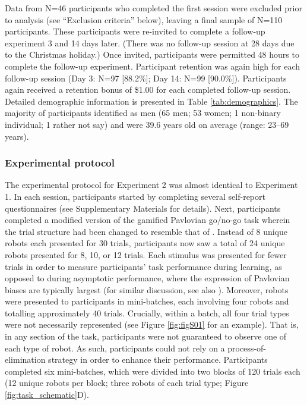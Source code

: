 \documentclass[a4paper,12pt]{article}
\begin{document}
\begin{refsection}[main]
Data from N=46 participants who completed the first session were excluded prior to analysis (see ``Exclusion criteria'' below), leaving a final sample of N=110 participants. These participants were re-invited to complete a follow-up experiment 3 and 14 days later. (There was no follow-up session at 28 days due to the Christmas holiday.) Once invited, participants were permitted 48 hours to complete the follow-up experiment. Participant retention was again high for each follow-up session (Day 3: N=97 [88.2\%]; Day 14: N=99 [90.0\%]). Participants again received a retention bonus of \$1.00 for each completed follow-up session. Detailed demographic information is presented in Table \ref{tab:demographics}. The majority of participants identified as men (65 men; 53 women; 1 non-binary individual; 1 rather not say) and were 39.6 years old on average (range: 23--69 years).

\subsubsection*{Experimental protocol}

The experimental protocol for Experiment 2 was almost identical to Experiment 1. In each session, participants started by completing several self-report questionnaires (see Supplementary Materials for details). Next, participants completed a modified version of the gamified Pavlovian go/no-go task wherein the trial structure had been changed to resemble that of \cite{wittmann2008striatal}. Instead of 8 unique robots each presented for 30 trials, participants now saw a total of 24 unique robots presented for 8, 10, or 12 trials. Each stimulus was presented for fewer trials in order to measure participants' task performance during learning, as opposed to during asymptotic performance, where the expression of Pavlovian biases are typically largest (for similar discussion, see also \cite{zorowitzPLACEHOLDER}). Moreover, robots were presented to participants in mini-batches, each involving four robots and totalling approximately 40 trials. Crucially, within a batch, all four trial types were not necessarily represented (see Figure \ref{fig:figS01} for an example). That is, in any section of the task, participants were not guaranteed to observe one of each type of robot. As such, participants could not rely on a process-of-elimination strategy in order to enhance their performance. Participants completed six mini-batches, which were divided into two blocks of 120 trials each (12 unique robots per block; three robots of each trial type; Figure \ref{fig:task_schematic}D).


\end{refsection}
\end{document}
